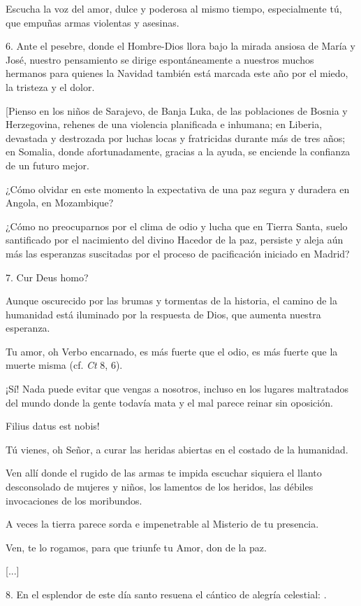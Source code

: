 \begin{body}
\begin{body}
		Escucha la voz del amor, dulce y poderosa al mismo tiempo, especialmente tú, que empuñas armas violentas y asesinas.
		
		6. Ante el pesebre, donde el Hombre-Dios llora bajo la mirada ansiosa de María y José, nuestro pensamiento se dirige espontáneamente a nuestros muchos hermanos para quienes la Navidad también está marcada este año por el miedo, la tristeza y el dolor.
		
		{[}Pienso en los niños de Sarajevo, de Banja Luka, de las poblaciones de Bosnia y Herzegovina, rehenes de una violencia planificada e inhumana; en Liberia, devastada y destrozada por luchas locas y fratricidas durante más de tres años; en Somalia, donde afortunadamente, gracias a la ayuda, se enciende la confianza de un futuro mejor.
		
		¿Cómo olvidar en este momento la expectativa de una paz segura y duradera en Angola, en Mozambique?
		
		¿Cómo no preocuparnos por el clima de odio y lucha que en Tierra Santa, suelo santificado por el nacimiento del divino Hacedor de la paz, persiste y aleja aún más las esperanzas suscitadas por el proceso de pacificación iniciado en Madrid?
		
		7. Cur Deus homo?
		
		Aunque oscurecido por las brumas y tormentas de la historia, el camino de la humanidad está iluminado por la respuesta de Dios, que aumenta nuestra esperanza.
		
		Tu amor, oh Verbo encarnado, es más fuerte que el odio, es más fuerte que la muerte misma (cf. \emph{Ct} 8, 6).
		
		¡Sí! Nada puede evitar que vengas a nosotros, incluso en los lugares maltratados del mundo donde la gente todavía mata y el mal parece reinar sin oposición.
		
		Filius datus est nobis!
		
		Tú vienes, oh Señor, a curar las heridas abiertas en el costado de la humanidad.
		
		Ven allí donde el rugido de las armas te impida escuchar siquiera el llanto desconsolado de mujeres y niños, los lamentos de los heridos, las débiles invocaciones de los moribundos.
		
		A veces la tierra parece sorda e impenetrable al Misterio de tu presencia.
		
		Ven, te lo rogamos, para que triunfe tu Amor, don de la paz.
		
		{[}...{]}
		
		8. En el esplendor de este día santo resuena el cántico de alegría celestial: .
		

\end{body}
\end{body}
